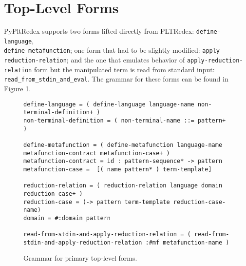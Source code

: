 \section{Top-Level Forms}

PyPltRedex supports two forms lifted directly from PLTRedex: \texttt{define-language}, \\ \texttt{define-metafunction}; one form that had to be slightly modified: \texttt{apply-reduction-relation}; and the one that emulates behavior of \texttt{apply-reduction-relation} form but the manipulated term is read from standard input: \texttt{read\_from\_stdin\_and\_eval}. The grammar for these forms can be found in Figure \ref{grammar-tlmain}.

\begin{figure}
\begin{verbatim}
define-language = ( define-language language-name non-terminal-definition+ )
non-terminal-definition = ( non-terminal-name ::= pattern+ )

define-metafunction = ( define-metafunction language-name metafunction-contract metafunction-case+ )
metafunction-contract =	id : pattern-sequence* -> pattern
metafunction-case =  [( name pattern* ) term-template]

reduction-relation = ( reduction-relation language domain reduction-case+ )
reduction-case = (-> pattern term-template reduction-case-name)
domain = #:domain pattern

read-from-stdin-and-apply-reduction-relation = ( read-from-stdin-and-apply-reduction-relation :#mf metafunction-name )
\end{verbatim}
\caption{Grammar for primary top-level forms.}
\label{grammar-tlmain}
\end{figure}

